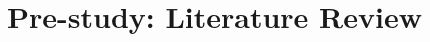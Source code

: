 \documentclass{sigchi}
\begin{document}







\section{Pre-study: Literature Review} 
\end{document}
